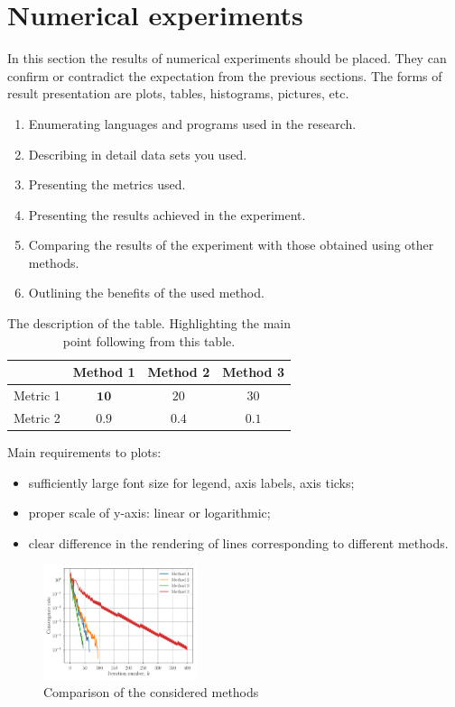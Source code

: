 \chapter{Numerical experiments}

In this section the results of numerical experiments should be placed.
They can confirm or contradict the expectation from the previous sections. 
The forms of result presentation are plots, tables, histograms, pictures, etc.
\begin{enumerate}
    \item Enumerating languages and programs used in the research.
    \item Describing in detail data sets you used.
    \item Presenting the metrics used.
    \item Presenting the results achieved in the experiment.
    \item Comparing the results of the experiment with those obtained using other methods.
    \item Outlining the benefits of the used method.
\end{enumerate}

\begin{table}[!htb]
    \centering
     \caption{
     The description of the table. Highlighting the main point following from this table.}
    \begin{tabular}{cccc}
    \toprule
         & Method 1 & Method 2 & Method 3  \\
        \midrule
      Metric 1   & $\mathbf{10}$ & $20$  & $30$ \\
      Metric 2   & $0.9$ & $0.4$ & $\mathbf{0.1}$ \\
      \bottomrule
    \end{tabular}
    \label{tab::methods_metrics}
\end{table}

Main requirements to plots:
\begin{itemize}
    \item sufficiently large font size for legend, axis labels, axis ticks;
    \item proper scale of y-axis: linear or logarithmic;
    \item clear difference in the rendering of lines corresponding to different methods.
\end{itemize}
\begin{figure}[!htb]
    \centering
    \includegraphics[width=0.4\textwidth]{images/test_plot.pdf}
    \caption{Comparison of the considered methods}
    \label{fig::x_vs_y}
\end{figure}


